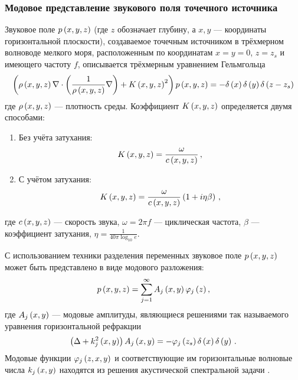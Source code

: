 \documentclass[../document.tex]{subfiles}
\begin{document}
        \subsubsection{Модовое представление звукового поля точечного источника}
            \par Звуковое поле $p\left(x,y,z\right)$ (где $z$ обозначает глубину, а  $x,y$ --- координаты горизонтальной плоскости), создаваемое точечным источником в трёхмерном волноводе мелкого моря, расположенным по координатам $x=y=0$, $z=z_s$ и имеющего частоту $f$, описывается трёхмерным уравнением Гельмгольца \cite{jensen}
            \begin{equation}\label{eq::3DH}
            \left(\rho\left(x,y,z\right)\nabla\cdot\left(\frac{1}{\rho\left(x,y,z\right)}\nabla\right) + K\left(x,y,z\right)^2\right)p\left(x,y,z\right)=-\delta\left(x\right)\delta\left(y\right)\delta\left(z-z_s\right)
            \end{equation}
            где $\rho\left(x,y,z\right)$ --- плотность среды. Коэффициент $K\left(x,y,z\right)$ определяется двумя способами:
            \begin{enumerate}
                \item Без учёта затухания:
                \begin{equation}\label{eq::K1}
                  K\left(x,y,z\right)=\frac{\omega}{c\left(x,y,z\right)}\,,
                \end{equation}
                \item С учётом затухания:
                \begin{equation}\label{eq::K2}
                    K\left(x,y,z\right)=\frac{\omega}{c\left(x,y,z\right)}\left(1+i\eta\beta\right)\,,
                \end{equation}
            \end{enumerate}
            где $c\left(x,y,z\right)$ --- скорость звука, $\omega=2\pi f$ --- циклическая частота, $\beta$ --- коэффициент затухания, $\eta=\frac{1}{40\pi\log_{10}e}$.
            \newpage
            \par С использованием техники разделения переменных звуковое поле $p\left(x,y,z\right)$ может быть представлено в виде модового разложения:
            \begin{equation}\label{eq::MD}
                p\left(x,y,z\right)=\sum\limits_{j=1}^\infty A_j\left(x,y\right)\varphi_j\left(z\right),
            \end{equation}
            где $A_j\left(x,y\right)$ --- модовые амплитуды, являющиеся решениями так называемого уравнения горизонтальной рефракции
            \begin{equation}\label{eq::HRE}
                \left(\Delta+k_j^2\left(x,y\right)\right)A_j\left(x,y\right)=-\varphi_j\left(z_s\right)\delta\left(x\right)\delta\left(y\right)\,.
            \end{equation}
            Модовые функции $\varphi_j\left(z,x,y\right)$ и соответствующие им горизонтальные волновые числа $k_j\left(x,y\right)$ находятся из решения акустической спектральной задачи \cite{jensen}.
\end{document}
